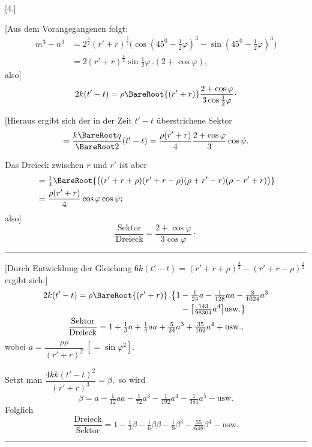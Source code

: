 \clearpage
{}
\begin{center}
[4.]\par
{}
\end{center}

[Aus dem Vorangegangenen folgt:
\[
\begin{aligned}
m^3-n^3&=2^{\frac32}(r'+r)^{\frac32}\bigl(\cos(45^0-\tfrac12\varphi)^3-\sin(45^0-\tfrac12\varphi)^3\bigr)\\
&=2(r'+r)^{\frac32}\sin\tfrac12\varphi\,.(2+\cos\varphi),
\end{aligned}
\]
also]
\[
2k(t'-t)=\rho\BareRoot{(r'+r)}\frac{2+\cos\varphi}{3\cos\tfrac12\varphi}\mathpunct{\cdot}
\]

[Hieraus ergibt sich der in der Zeit \(t'-t\) überstrichene Sektor
\[
=\frac{k\BareRoot q}{\BareRoot2}(t'-t)=\frac{\rho(r'+r)}4\frac{2+\cos\varphi}3\cos\psi.
\]

Das Dreieck zwischen \(r\) und \(r'\) ist aber
\[
\begin{aligned}
&=\tfrac14\BareRoot{\bigl((r'+r+\rho)(r'+r-\rho)(\rho+r'-r)(\rho-r'+r)\bigr)}\\
&=\frac{\rho(r'+r)}4\cos\varphi\cos\psi;
\end{aligned}
\]
also]
\[
\frac{\mathrm{Sektor}}{\mathrm{Dreieck}}=\frac{2+\cos\varphi}{3\cos\varphi}\mathpunct{\cdot}
\]
\begin{center}\rule{.3\linewidth}{.4pt}\end{center}

[Durch Entwicklung der Gleichung \(6k(t'-t)=(r'+r+\rho)^{\frac32}-(r'+r-\rho)^{\frac32}\) ergibt sich:]
\[
\begin{gathered}
\begin{aligned}
2k(t'-t)=\rho\BareRoot{(r'+r)}\,.\bigl\{1&-\tfrac1{24}a-\tfrac1{128}aa-\tfrac3{1024}a^3\\
&-\bigl[\tfrac{143}{98304}a^4\bigr]\mathrm{usw.}\bigr\}
\end{aligned}\\
\frac{\mathrm{Sektor}}{\mathrm{Dreieck}}=1+\tfrac13a+\tfrac14aa+\tfrac5{24}a^3+\tfrac{35}{192}a^4+\mathrm{usw.},
\end{gathered}
\]
wobei \(a=\dfrac{\rho\rho}{(r'+r)^2}\ [=\sin\varphi^2].\)

Setzt man \(\dfrac{4kk(t'-t)^2}{(r'+r)^3}=\beta,\) so wird
\[
\beta=a-\tfrac1{12}aa-\tfrac1{72}a^3-\tfrac1{192}a^4-\tfrac1{384}a^5-\mathrm{usw.}
\]
Folglich
\[
\frac{\mathrm{Dreieck}}{\mathrm{Sektor}}=1-\tfrac13\beta-\tfrac16\beta\beta-\tfrac19\beta^3-\tfrac{55}{648}\beta^4-\mathrm{usw.}
\]
\begin{center}\rule{.3\linewidth}{.4pt}\end{center}

